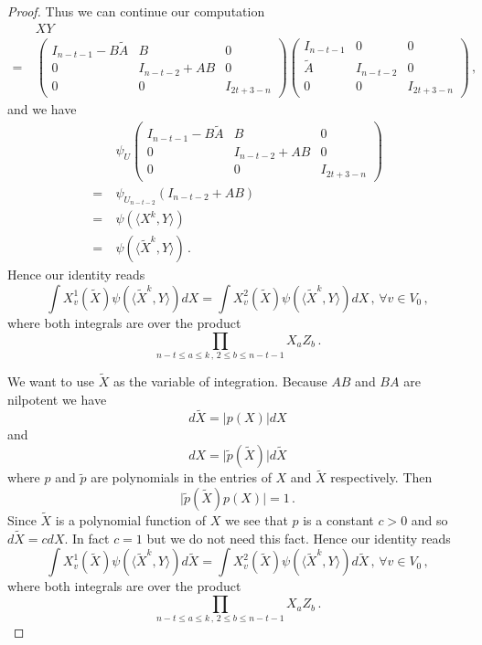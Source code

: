 \documentclass[12pt]{amsart}
\begin{document}
\begin{proof}
Thus we can continue our computation
\begin{align*}
\ & XY \\
= \ & \left(\begin{array}{ccc} I_{n-t-1} -B \widetilde{A} & B & 0 \\ 0 & I_{ n-t-2}+ AB&0 \\ 0 &0 &I_{ 2t + 3 -n} \end{array}\right) \left(\begin{array}{ccc} I_{n-t-1} & 0 & 0 \\ \widetilde{A} & I_{ n-t-2}&0 \\ 0 &0 &I_{ 2t + 3 -n} \end{array}\right)\,,
\end{align*}
and we have
\begin{align*}
\ & \psi_U \left(\begin{array}{ccc} I_{n-t-1} -B \widetilde{A} & B & 0 \\ 0 & I_{ n-t-2}+ AB&0 \\ 0 &0 &I_{ 2t + 3 -n} \end{array}\right) \\
= \ & \psi_{U_{n-t-2}} ( I_{n-t-2} +AB) \\
= \ & \psi (\langle X^k,Y\rangle) \\
= \ & \psi (\langle \widetilde{X}^k,Y\rangle ) \,.
\end{align*}
Hence our identity reads
\[ \int X_v^1 (\widetilde{X} ) \psi (\langle \widetilde{X}^k,Y\rangle ) d X = \int X_v^2 (\widetilde{X} ) \psi (\langle \widetilde{X}^k,Y\rangle ) d X\,,\, \forall v \in V_0\,, \]
where both integrals are over the product
\[ \prod_{n-t \leq a \leq k\,,\, 2 \leq b \leq n-t-1} X_a Z_ b\,.\]

We want to use $\widetilde{X}$ as the variable of integration. Because $AB$ and $BA$ are nilpotent
we have
\[ d \widetilde{X} =\lvert p(X)\rvert d X \]
and
\[ d  X = \vert \widetilde{p} (\widetilde{X})\rvert d \widetilde {X} \]
where $p$ and $\widetilde{p}$ are polynomials in the entries of $X$ and $\widetilde{X}$ respectively.
Then
\[ \vert \widetilde{p}(\widetilde{X}) p(X)\rvert =1 \,.\]
Since $\widetilde{X}$ is a polynomial function of $X$ we see that $p$ is a constant $c>0$ and so $d \widetilde{X} =c d X$. In fact $c=1$ but we do not need this fact.
Hence our identity reads
\[ \int X_v^1 (\widetilde{X} ) \psi (\langle \widetilde{X}^k,Y\rangle ) d \widetilde{X} = \int X_v^2 (\widetilde{X} ) \psi (\langle \widetilde{X}^k,Y\rangle ) d \widetilde{X}\,,\, \forall v \in V_0\,,  \]
where both integrals are over the product
\[ \prod_{n-t \leq a \leq k\,,\, 2 \leq b \leq n-t-1} X_a Z_ b\,.\]


\end{proof}
\end{document}
